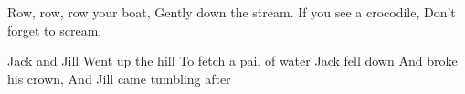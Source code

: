 \documentclass{article}
\begin{document}
\setlength{\columnseprule}{3pt} %
\begin{multicols}{2} %
Row, row, row your boat,
Gently down the stream.
If you see a crocodile,
Don't forget to scream.

\columnbreak
Jack and Jill
Went up the hill
To fetch a pail of water
Jack fell down
And broke his crown,
And Jill came tumbling after
\end{multicols}
\end{document}
